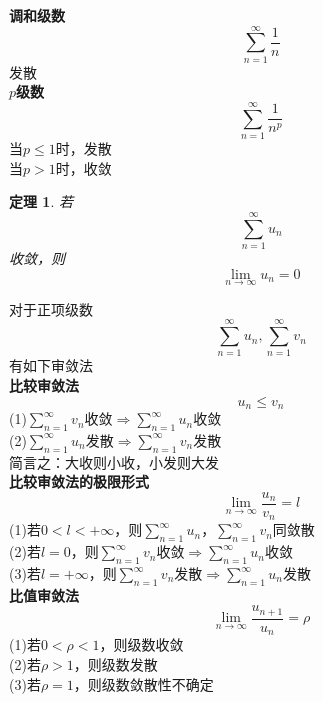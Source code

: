 \documentclass[12pt, a4paper, twoside]{ctexbook}
\newtheorem{theorem}{定理}[section]
\begin{document}
\textbf{调和级数}
$$
\sum_{n=1}^{\infty}\frac{1}{n}
$$
\hspace*{3em}发散\\

\textbf{$p$级数}
$$
\sum_{n=1}^{\infty}\frac{1}{n^p}
$$
\hspace*{3em}当$p\leqslant1$时，发散\\
\hspace*{3em}当$p>1$时，收敛\\

\begin{theorem}
	若
	$$
	\sum_{n=1}^{\infty}u_n
	$$
	收敛，则
	$$
	\lim_{n\to\infty}u_n=0
	$$
\end{theorem}
对于正项级数
$$
\sum_{n=1}^{\infty}u_n,\sum_{n=1}^{\infty}v_n
$$
有如下审敛法\\

\textbf{比较审敛法}
$$u_n\leqslant v_n$$
\hspace*{3em}(1)$\sum\limits_{n=1}^{\infty}v_n$收敛$\Rightarrow\sum\limits_{n=1}^{\infty}u_n$收敛\\
\hspace*{3em}(2)$\sum\limits_{n=1}^{\infty}u_n$发散$\Rightarrow\sum\limits_{n=1}^{\infty}v_n$发散\\
\hspace*{3em}简言之：大收则小收，小发则大发\\

\textbf{比较审敛法的极限形式}
$$
\lim_{n\to\infty}\frac{u_n}{v_n}=l
$$
\hspace*{3em}(1)若$0<l<+\infty$，则$\sum\limits_{n=1}^{\infty}u_n$，$\sum\limits_{n=1}^{\infty}v_n$同敛散\\
\hspace*{3em}(2)若$l=0$，则$\sum\limits_{n=1}^{\infty}v_n$收敛$\Rightarrow\sum\limits_{n=1}^{\infty}u_n$收敛\\
\hspace*{3em}(3)若$l=+\infty$，则$\sum\limits_{n=1}^{\infty}v_n$发散$\Rightarrow\sum\limits_{n=1}^{\infty}u_n$发散\\

\textbf{比值审敛法}
$$
\lim_{n\to \infty}\frac{u_{n+1}}{u_n}=\rho
$$
\hspace*{3em}(1)若$0<\rho<1$，则级数收敛\\
\hspace*{3em}(2)若$\rho>1$，则级数发散\\
\hspace*{3em}(3)若$\rho=1$，则级数敛散性不确定\\
\end{document}
